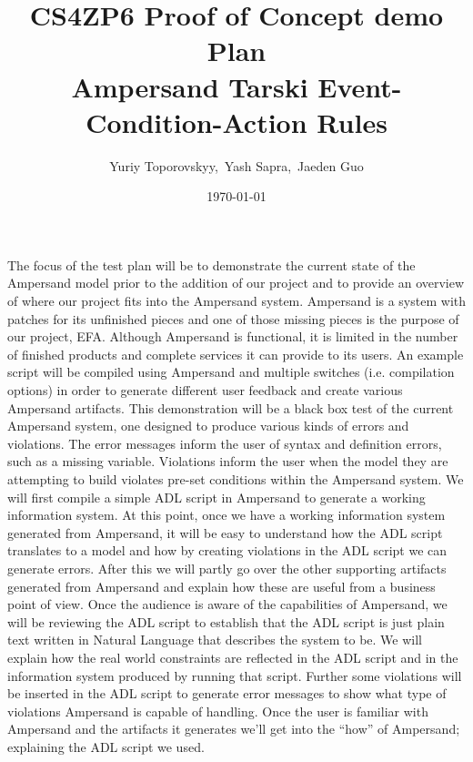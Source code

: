 \documentclass[12pt]{article}
\begin{document}
\title{CS4ZP6 Proof of Concept demo Plan \\ Ampersand Tarski Event-Condition-Action 
Rules \\ \vspace{-1ex}} 
\author{\normalsize{Yuriy Toporovskyy,\ Yash Sapra,\ Jaeden Guo}}
\date{\normalsize\today \vspace{-3ex}}
\thispagestyle{empty}
\maketitle
\paragraph{}
The focus of the test plan will be to demonstrate the current state of the 
Ampersand model prior to the addition of our project and to provide an overview 
of where our project fits into the Ampersand system. Ampersand is a system with 
patches for its unfinished pieces and one of those missing pieces is the 
purpose of our project, EFA. Although Ampersand is functional, it is limited in 
the number of finished products and complete services it can provide to its 
users. An example script will be compiled using Ampersand and multiple switches 
(i.e. compilation options) in order to generate different user feedback and 
create various Ampersand artifacts. This demonstration will be a black box test of the current Ampersand 
system, one designed to produce various kinds of errors and violations. The 
error messages inform the user of syntax and definition errors, such as a 
missing variable. Violations inform the user when the model they are attempting 
to build violates pre-set conditions within the Ampersand system. 
\newline
\indent We will first compile a simple ADL script in Ampersand to generate a working
information system. At this point, once we have a working information system generated from Ampersand,
it will be easy to understand how the ADL script translates to a model and how by creating violations in the ADL script we can generate errors. After this we will partly go over the other supporting artifacts generated from Ampersand and explain how these are useful from a business point of view. 
Once the audience is aware of the capabilities of Ampersand, we will be reviewing 
the ADL script to establish that the ADL script is just plain text written in Natural Language that
 describes the system to be.
We will explain how the real world constraints are reflected in the ADL script and in the information system produced by running that script. Further some violations will be inserted in the ADL script to generate error messages to show what type of violations Ampersand is capable of handling. Once the user is familiar with Ampersand and the artifacts it generates we'll get into the ``how'' of  Ampersand; explaining the ADL script we used. 
 
\end{document}
